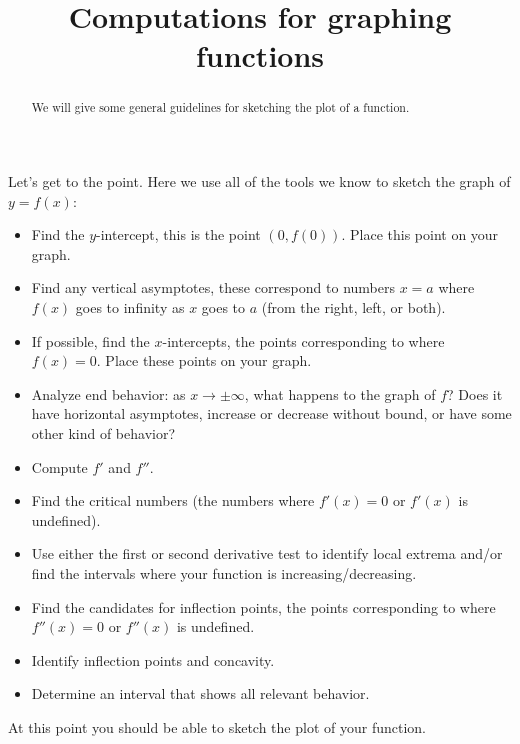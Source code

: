 \documentclass[wordchoicegiven]{ximera}
\title[Dig-In:]{Computations for graphing functions}
\begin{document}
\begin{abstract}
  We will give some general guidelines for sketching the plot of a
  function.
\end{abstract}
\maketitle

Let's get to the point. Here we use all of the tools we know to sketch
the graph of $y=f(x)$:


\begin{itemize}
\item Find the $y$-intercept, this is the point $(0,f(0))$. Place this
  point on your graph.
\item Find any vertical asymptotes, these correspond to numbers $x=a$ where
  $f(x)$ goes to infinity as $x$ goes to $a$ (from the right, left, or
  both).
  \item If possible, find the $x$-intercepts, the points corresponding to where $f(x) =
  0$. Place these points on your graph.
\item Analyze end behavior:  as $x \to \pm \infty$, what happens to the graph of $f$?  Does it  have horizontal asymptotes, increase or decrease without bound, or have some other kind of behavior?
\item Compute $f'$ and $f''$.
\item Find the critical numbers (the numbers where $f'(x) = 0$ or
  $f'(x)$ is undefined).
\item Use either the first or second derivative test to identify local extrema and/or
  find the intervals where your function is increasing/decreasing.
\item Find the candidates for inflection points, the points corresponding to where
  $f''(x) = 0$ or $f''(x)$ is undefined.
\item Identify inflection points and concavity.

\item Determine an interval that shows all relevant behavior.
\end{itemize}
At this point you should be able to sketch the plot of your function.
\end{document}
